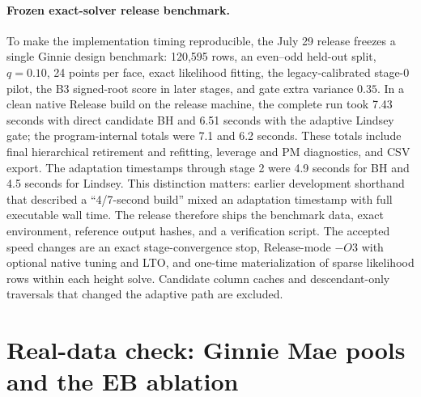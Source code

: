 \documentclass[11pt]{article}
\begin{document}
\paragraph{Frozen exact-solver release benchmark.}
To make the implementation timing reproducible, the July 29 release freezes a
single Ginnie design benchmark: 120{,}595 rows, an even--odd held-out split,
$q=0.10$, 24 points per face, exact likelihood fitting, the legacy-calibrated
stage-0 pilot, the B3 signed-root score in later stages, and gate extra variance
$0.35$.  In a clean native Release build on the release machine, the complete
run took 7.43 seconds with direct candidate BH and 6.51 seconds with the
adaptive Lindsey gate; the program-internal totals were 7.1 and 6.2 seconds.
These totals include final hierarchical retirement and refitting, leverage and
PM diagnostics, and CSV export.  The adaptation timestamps through stage 2
were 4.9 seconds for BH and 4.5 seconds for Lindsey.  This distinction matters:
earlier development shorthand that described a ``4/7-second build'' mixed an
adaptation timestamp with full executable wall time.  The release therefore
ships the benchmark data, exact environment, reference output hashes, and a
verification script.  The accepted speed changes are an exact stage-convergence
stop, Release-mode $-O3$ with optional native tuning and LTO, and one-time
materialization of sparse likelihood rows within each height solve.  Candidate
column caches and descendant-only traversals that changed the adaptive path are
excluded.

\section{Real-data check: Ginnie Mae pools and the EB ablation}\label{sec:realdata}
\end{document}
